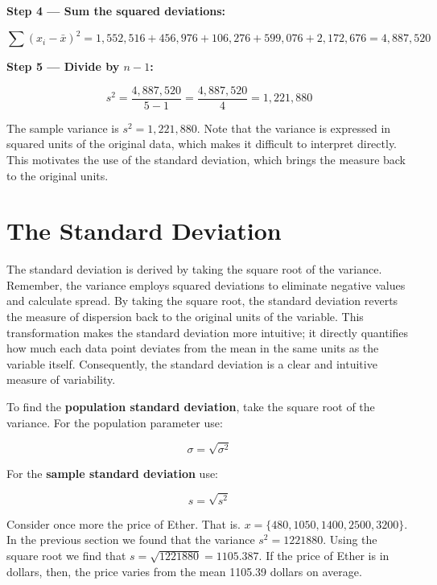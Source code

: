 \documentclass[
  11pt,
  letterpaper,
  DIV=11,
  numbers=noendperiod,
  oneside,
  open=any]{scrreprt}
\begin{document}
\textbf{Step 4 --- Sum the squared deviations:}

\[\sum(x_i-\bar{x})^2 = 1{,}552{,}516 + 456{,}976 + 106{,}276 + 599{,}076 + 2{,}172{,}676 = 4{,}887{,}520\]

\textbf{Step 5 --- Divide by \(n-1\):}

\[s^2 = \frac{4{,}887{,}520}{5-1} = \frac{4{,}887{,}520}{4} = 1{,}221{,}880\]

The sample variance is \(s^2=1{,}221{,}880\). Note that the variance is
expressed in squared units of the original data, which makes it
difficult to interpret directly. This motivates the use of the standard
deviation, which brings the measure back to the original units.

\section{The Standard Deviation}\label{the-standard-deviation}

The standard deviation is derived by taking the square root of the
variance. Remember, the variance employs squared deviations to eliminate
negative values and calculate spread. By taking the square root, the
standard deviation reverts the measure of dispersion back to the
original units of the variable. This transformation makes the standard
deviation more intuitive; it directly quantifies how much each data
point deviates from the mean in the same units as the variable itself.
Consequently, the standard deviation is a clear and intuitive measure of
variability.

To find the \textbf{population standard deviation}, take the square root
of the variance. For the population parameter use:

\begin{bsformula}

\[\sigma=\sqrt{\sigma^2}\]

\end{bsformula}

For the \textbf{sample standard deviation} use:

\begin{bsformula}

\[s=\sqrt{s^2}\]

\end{bsformula}

\begin{bsexample}[Example]

Consider once more the price of Ether. That is.
\(x=\{480, 1050, 1400, 2500, 3200\}\). In the previous section we found
that the variance \(s^2=1221880\). Using the square root we find that
\(s=\sqrt{1221880}=1105.387\). If the price of Ether is in dollars,
then, the price varies from the mean 1105.39 dollars on average.

\end{bsexample}
\end{document}
